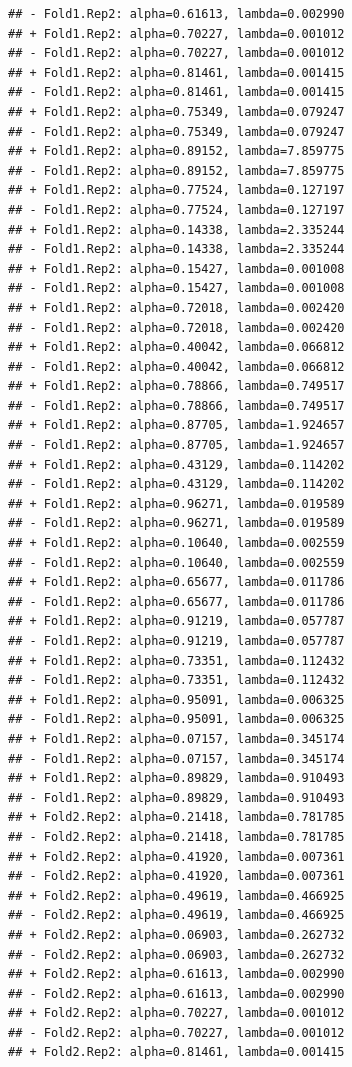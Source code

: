 \documentclass[
]{article}
\begin{document}
\begin{verbatim}
## - Fold1.Rep2: alpha=0.61613, lambda=0.002990 
## + Fold1.Rep2: alpha=0.70227, lambda=0.001012 
## - Fold1.Rep2: alpha=0.70227, lambda=0.001012 
## + Fold1.Rep2: alpha=0.81461, lambda=0.001415 
## - Fold1.Rep2: alpha=0.81461, lambda=0.001415 
## + Fold1.Rep2: alpha=0.75349, lambda=0.079247 
## - Fold1.Rep2: alpha=0.75349, lambda=0.079247 
## + Fold1.Rep2: alpha=0.89152, lambda=7.859775 
## - Fold1.Rep2: alpha=0.89152, lambda=7.859775 
## + Fold1.Rep2: alpha=0.77524, lambda=0.127197 
## - Fold1.Rep2: alpha=0.77524, lambda=0.127197 
## + Fold1.Rep2: alpha=0.14338, lambda=2.335244 
## - Fold1.Rep2: alpha=0.14338, lambda=2.335244 
## + Fold1.Rep2: alpha=0.15427, lambda=0.001008 
## - Fold1.Rep2: alpha=0.15427, lambda=0.001008 
## + Fold1.Rep2: alpha=0.72018, lambda=0.002420 
## - Fold1.Rep2: alpha=0.72018, lambda=0.002420 
## + Fold1.Rep2: alpha=0.40042, lambda=0.066812 
## - Fold1.Rep2: alpha=0.40042, lambda=0.066812 
## + Fold1.Rep2: alpha=0.78866, lambda=0.749517 
## - Fold1.Rep2: alpha=0.78866, lambda=0.749517 
## + Fold1.Rep2: alpha=0.87705, lambda=1.924657 
## - Fold1.Rep2: alpha=0.87705, lambda=1.924657 
## + Fold1.Rep2: alpha=0.43129, lambda=0.114202 
## - Fold1.Rep2: alpha=0.43129, lambda=0.114202 
## + Fold1.Rep2: alpha=0.96271, lambda=0.019589 
## - Fold1.Rep2: alpha=0.96271, lambda=0.019589 
## + Fold1.Rep2: alpha=0.10640, lambda=0.002559 
## - Fold1.Rep2: alpha=0.10640, lambda=0.002559 
## + Fold1.Rep2: alpha=0.65677, lambda=0.011786 
## - Fold1.Rep2: alpha=0.65677, lambda=0.011786 
## + Fold1.Rep2: alpha=0.91219, lambda=0.057787 
## - Fold1.Rep2: alpha=0.91219, lambda=0.057787 
## + Fold1.Rep2: alpha=0.73351, lambda=0.112432 
## - Fold1.Rep2: alpha=0.73351, lambda=0.112432 
## + Fold1.Rep2: alpha=0.95091, lambda=0.006325 
## - Fold1.Rep2: alpha=0.95091, lambda=0.006325 
## + Fold1.Rep2: alpha=0.07157, lambda=0.345174 
## - Fold1.Rep2: alpha=0.07157, lambda=0.345174 
## + Fold1.Rep2: alpha=0.89829, lambda=0.910493 
## - Fold1.Rep2: alpha=0.89829, lambda=0.910493 
## + Fold2.Rep2: alpha=0.21418, lambda=0.781785 
## - Fold2.Rep2: alpha=0.21418, lambda=0.781785 
## + Fold2.Rep2: alpha=0.41920, lambda=0.007361 
## - Fold2.Rep2: alpha=0.41920, lambda=0.007361 
## + Fold2.Rep2: alpha=0.49619, lambda=0.466925 
## - Fold2.Rep2: alpha=0.49619, lambda=0.466925 
## + Fold2.Rep2: alpha=0.06903, lambda=0.262732 
## - Fold2.Rep2: alpha=0.06903, lambda=0.262732 
## + Fold2.Rep2: alpha=0.61613, lambda=0.002990 
## - Fold2.Rep2: alpha=0.61613, lambda=0.002990 
## + Fold2.Rep2: alpha=0.70227, lambda=0.001012 
## - Fold2.Rep2: alpha=0.70227, lambda=0.001012 
## + Fold2.Rep2: alpha=0.81461, lambda=0.001415 

\end{verbatim}
\end{document}
